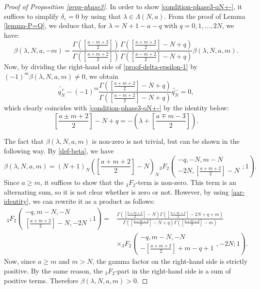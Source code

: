 \documentclass[12pt, pdflatex, a4paper]{article}
\theoremstyle{plain}
\theoremstyle{definition}
\begin{document}
\begin{proof}[Proof of Proposition \ref{prop-phase3}]
In order to show \eqref{condition-phase3-qN+-}, it suffices to simplify $\delta_\varepsilon = 0$ by using that $\lambda \in \Lambda(N,a)$. From the proof of Lemma \ref{lemma-P=Q}, we deduce that, for $\lambda = N+1-a-q$ with $q = 0, 1, \ldots, 2N$, we have:
\begin{equation}\label{proof-beta-relation}
\beta(\lambda, N, a, -m)= \frac{\Gamma(\left[\frac{a-m+2}{2}\right])}{\Gamma(\left[\frac{a+m+2}{2}\right])}\frac{\Gamma(\left[\frac{a+m+2}{2}\right]-N+q)}{\Gamma(\left[\frac{a-m+2}{2}\right] -N+q)}  \beta(\lambda, N, a, m).
\end{equation}
Now, by dividing the right-hand side of \eqref{proof-delta-epsilon-1} by $(-1)^m\beta(\lambda, N, a, m) \neq 0$, we obtain
\begin{equation*}
\widetilde{q_N^+} - (-1)^m \frac{\Gamma(\left[\frac{a+m+2}{2}\right]-N+q)}{\Gamma(\left[\frac{a-m+2}{2}\right] -N+q)} \widetilde{q_N^-} = 0,
\end{equation*}
which clearly coincides with \eqref{condition-phase3-qN+-} by the identity below:
\begin{equation*}
\left[\frac{a\pm m+2}{2}\right] -N+q = -\left(\lambda+ \left[\frac{a\mp m-3}{2}\right]\right).
\end{equation*}

The fact that $\beta(\lambda, N, a, m)$ is non-zero is not trivial, but can be shown in the following way. By \eqref{def-beta}, we have
\begin{equation*}
\beta(\lambda, N, a, m) = (N+1)_N\left(\left[\frac{a+m+2}{2}\right]-N\right)_N{}_3F_2\left(\begin{matrix}
-q, -N, m-N\\ -2N, \left[\frac{a+m+2}{2}\right]-N
\end{matrix}; 1\right).
\end{equation*}
Since $a \geq m$, it suffices to show that the ${}_3F_2$-term is non-zero. This term is an alternating sum, so it is not clear whether is zero or not. However, by using \eqref{aar-identity}, we can rewrite it as a product as follows:
\begin{align*}
{}_3F_2\left(\begin{matrix}
-q, m-N, -N\\ \left[\frac{a+m+2}{2}\right]-N, -2N
\end{matrix}; 1\right) = &\frac{\Gamma(\left[\frac{a+m+2}{2}\right]-N)\Gamma(\left[\frac{a+m+2}{2}\right]-2N+q+m)}{\Gamma(\left[\frac{a+m+2}{2}\right]-N+q)\Gamma(\left[\frac{a+m+2}{2}\right]-m)}\\
&\times {}_3F_2\left(\begin{matrix}
-q, m-N, -N\\ -\left[\frac{a+m+2}{2}\right]+m-q+1
\end{matrix}, -2N; 1\right).
\end{align*}
Now, since $a \geq m$ and $m>N$, the gamma factor on the right-hand side is strictly positive. By the same reason, the ${}_3F_2$-part in the right-hand side is a sum of positive terms. Therefore $\beta(\lambda, N, a, m) > 0$. 



\end{proof}
\end{document}
